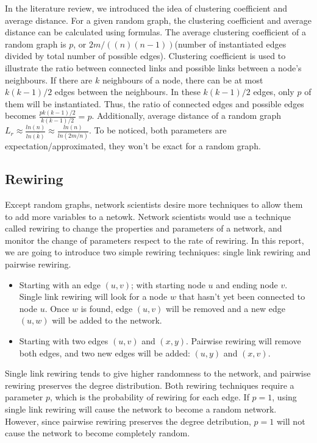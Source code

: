 \documentclass[12pt]{article}
\begin{document}
\noindent
In the literature review\cite{litreview}, we introduced the idea of clustering coefficient and average distance. For a given random graph, the clustering coefficient and average distance can be calculated using formulas.\cite{barabási2016network} The average clustering coefficient of a random graph is $p$, or $2m/((n)(n-1))$(number of instantiated edges divided by total number of possible edges). Clustering coefficient is used to illustrate the ratio between connected links and possible links between a node's neighbours. If there are $k$ neighbours of a node, there can be at most $k(k-1)/2$ edges between the neighbours. In these $k(k-1)/2$ edges, only $p$ of them will be instantiated. Thus, the ratio of connected edges and possible edges becomes $\frac{pk(k-1)/2}{k(k-1)/2}=p$. Additionally, average distance of a random graph $L_r \approx \frac{ln(n)}{ln\bar{(k)}}\approx \frac{ln(n)}{ln(2m/n)}$. To be noticed, both parameters are expectation/approximated, they won't be exact for a random graph.

\subsection{Rewiring}
\label{rewiring}
Except random graphs, network scientists desire more techniques to allow them to add more variables to a netowk. Network scientists would use a technique called rewiring to change the properties and parameters of a network, and monitor the change of parameters respect to the rate of rewiring.\cite{network_rewiring} In this report, we are going to introduce two simple rewiring techniques: single link rewiring and pairwise rewiring.\\
\begin{itemize}
    \item Starting with an edge $(u,v)$; with starting node $u$ and ending node $v$. Single link rewiring will look for a node $w$ that hasn't yet been connected to node $u$. Once $w$ is found, edge $(u,v)$ will be removed and a new edge $(u,w)$ will be added to the network. 
    \item Starting with two edges $(u,v)$ and $(x,y)$. Pairwise rewiring will remove both edges, and two new edges will be added: $(u,y)$ and $(x,v)$.
\end{itemize}
\noindent
Single link rewiring tends to give higher randomness to the network, and pairwise rewiring preserves the degree distribution. Both rewiring techniques require a parameter $p$, which is the probability of rewiring for each edge. If $p=1$, using single link rewiring will cause the network to become a random network. However, since pairwise rewiring preserves the degree detribution, $p=1$ will not cause the network to become completely random.
\end{document}
